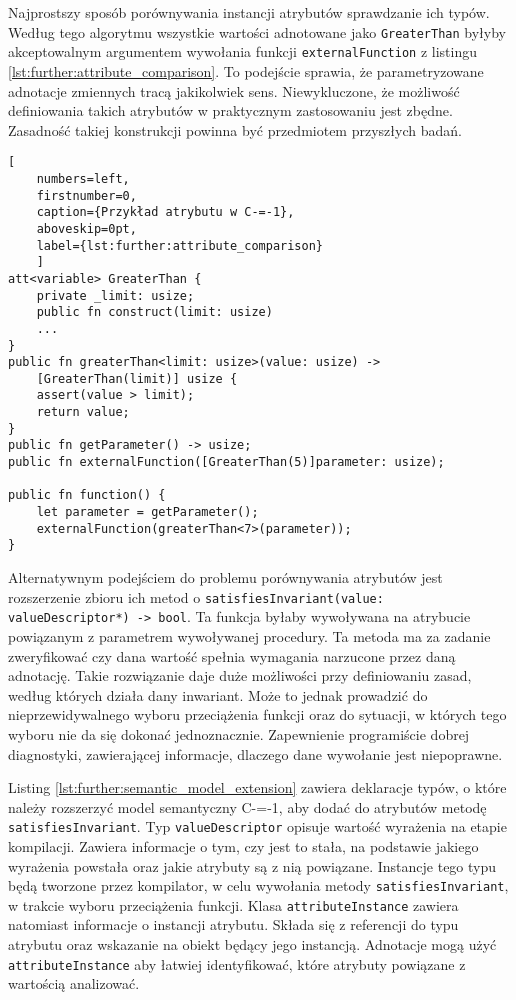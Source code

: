 Najprostszy sposób porównywania instancji atrybutów sprawdzanie ich typów.
Według tego algorytmu wszystkie wartości adnotowane jako \lstinline{GreaterThan} byłyby akceptowalnym argumentem wywołania funkcji \lstinline{externalFunction} z listingu \ref{lst:further:attribute_comparison}.
To podejście sprawia, że parametryzowane adnotacje zmiennych tracą jakikolwiek sens.
Niewykluczone, że możliwość definiowania takich atrybutów w praktycznym zastosowaniu jest zbędne.
Zasadność takiej konstrukcji powinna być przedmiotem przyszłych badań.

\begin{minipage}{\textwidth}

\begin{lstlisting}[
	numbers=left,
	firstnumber=0,
	caption={Przykład atrybutu w C-=-1},
	aboveskip=0pt,
	label={lst:further:attribute_comparison}
	]
att<variable> GreaterThan {
	private _limit: usize;
	public fn construct(limit: usize)
	...
}
public fn greaterThan<limit: usize>(value: usize) -> 
	[GreaterThan(limit)] usize {
	assert(value > limit);
	return value;
}
public fn getParameter() -> usize;
public fn externalFunction([GreaterThan(5)]parameter: usize);

public fn function() {
	let parameter = getParameter();
	externalFunction(greaterThan<7>(parameter));
}
\end{lstlisting}
\end{minipage}

Alternatywnym podejściem do problemu porównywania atrybutów jest rozszerzenie zbioru ich metod o \lstinline{satisfiesInvariant(value: valueDescriptor*) -> bool}.
Ta funkcja byłaby wywoływana na atrybucie powiązanym z parametrem wywoływanej procedury.
Ta metoda ma za zadanie zweryfikować czy dana wartość spełnia wymagania narzucone przez daną adnotację.
Takie rozwiązanie daje duże możliwości przy definiowaniu zasad, według których działa dany inwariant.
Może to jednak prowadzić do nieprzewidywalnego wyboru przeciążenia funkcji oraz do sytuacji, w których tego wyboru nie da się dokonać jednoznacznie.
Zapewnienie programiście dobrej diagnostyki, zawierającej informacje, dlaczego dane wywołanie jest niepoprawne.

Listing \ref{lst:further:semantic_model_extension} zawiera deklaracje typów, o które należy rozszerzyć model semantyczny C-=-1, aby dodać do atrybutów metodę \lstinline{satisfiesInvariant}.
Typ \lstinline{valueDescriptor} opisuje wartość wyrażenia na etapie kompilacji.
Zawiera informacje o tym, czy jest to stała, na podstawie jakiego wyrażenia powstała oraz jakie atrybuty są z nią powiązane.
Instancje tego typu będą tworzone przez kompilator, w celu wywołania metody \lstinline{satisfiesInvariant}, w trakcie wyboru przeciążenia funkcji.
Klasa \lstinline{attributeInstance} zawiera natomiast informacje o instancji atrybutu.
Składa się z referencji do typu atrybutu oraz wskazanie na obiekt będący jego instancją.
Adnotacje mogą użyć \lstinline{attributeInstance} aby łatwiej identyfikować, które atrybuty powiązane z wartością analizować.


